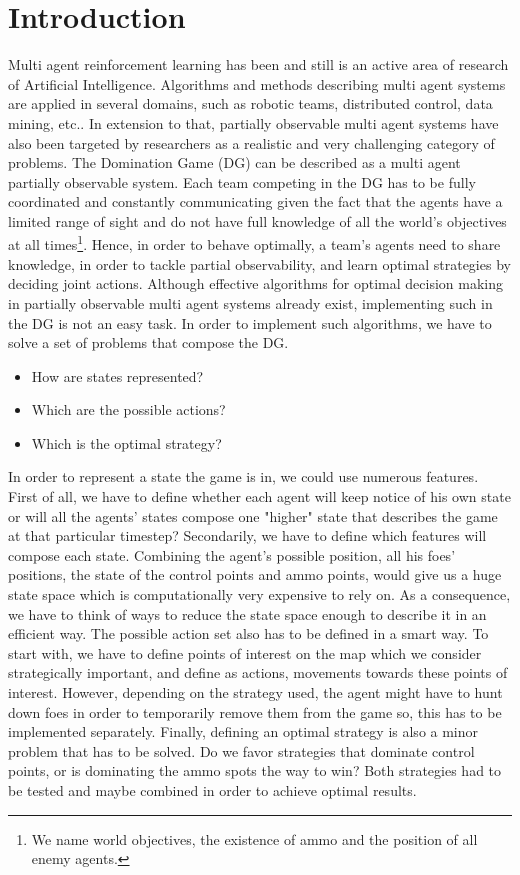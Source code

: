 \documentclass[conference]{IEEEtran}
\begin{document}
\section{Introduction}
Multi agent reinforcement learning has been and still is an active area of research of Artificial Intelligence. Algorithms and methods describing multi agent systems are applied in several domains, such as robotic teams, distributed control, data mining, etc.\cite{MARL}. In extension to that, partially observable multi agent systems have also been targeted by researchers as a realistic and very challenging category of problems. 
	The Domination Game (DG) can be described as a multi agent partially observable system. Each team competing in the DG has to be fully coordinated and constantly communicating given the fact that the agents have a limited range of sight and do not have full knowledge of all the world’s objectives at all times\footnote{We name world objectives, the existence of ammo and the position of all enemy agents.}. Hence, in order to behave optimally, a team’s agents need to share knowledge, in order to tackle partial observability, and learn optimal strategies by deciding joint actions. 
	Although effective algorithms for optimal decision making in partially observable multi agent systems already exist, implementing such in the DG is not an easy task. In order to implement such algorithms, we have to solve a set of problems that compose the DG.
\begin{itemize}

\item How are states represented?
\item Which are the possible actions? 
\item Which is the optimal strategy?

\end{itemize}	
	In order to represent a state the game is in, we could use numerous features. First of all, we have to define whether each agent will keep notice of his own state or will all the agents' states compose one "higher" state that describes the game at that particular timestep? Secondarily, we have to define which features will compose each state. Combining the agent's possible position, all his foes' positions, the state of the control points and ammo points, would give us a huge state space which is computationally very expensive to rely on. As a consequence, we have to think of ways to reduce the state space enough to describe it in an efficient way.
	The possible action set also has to be defined in a smart way. To start with, we have to define points of interest on the map which we consider strategically important, and define as actions, movements towards these points of interest. However, depending on the strategy used, the agent might have to hunt down foes in order to temporarily remove them from the game so, this has to be implemented separately.
	Finally, defining an optimal strategy is also a minor problem that has to be solved. Do we favor strategies that dominate control points, or is dominating the ammo spots the way to win? Both strategies had to be tested and maybe combined in order to achieve optimal results.
\end{document}
